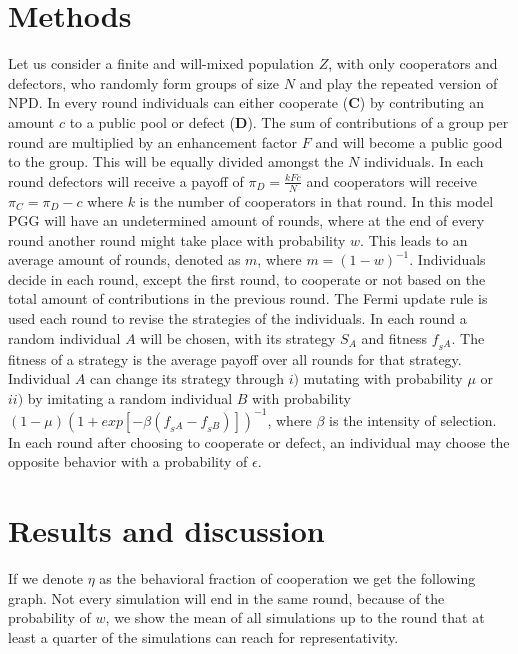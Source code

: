 \documentclass[letterpaper]{article}
\begin{document}
\section{Methods}
Let us consider a finite and will-mixed population $Z$, with only cooperators and defectors, who randomly form groups of size $N$ and play the repeated version of NPD. In every round individuals can either cooperate (\textbf{C}) by contributing an amount $c$ to a public pool or defect (\textbf{D}). The sum of contributions of a group per round are multiplied by an enhancement factor $F$ and will become a public good to the group. This will be equally divided amongst  the $N$ individuals. In each round defectors will receive a payoff of $\pi_{D}= \frac{kFc}{N}$  and cooperators will receive $\pi_{C}=\pi_{D}-c$ where $k$ is the number of cooperators in that round. In this model PGG will have an undetermined amount of rounds, where at the end of every round another round might take place with probability $w$. This leads to an average amount of rounds, denoted as $m$, where $m= (1-w)^{-1}$. Individuals decide in each round, except the first round, to cooperate or not based on the total amount of contributions in the previous round.
The Fermi update rule \citep{traulsen2006stochastic,grujic2014comparative} is used each round to revise the strategies of the individuals.
In each round a random individual $A$ will be chosen, with its strategy $S_{A}$ and fitness $f_{_S{A}}$. The fitness of a strategy is the average payoff over all rounds for that strategy. Individual $A$ can change its strategy through $i)$ mutating with probability $\mu$ or $ii)$ by imitating a random individual $B$ with probability $(1-\mu)(1+exp[-\beta(f_{_S{A}}-f_{_S{B}})])^{-1}$, where $\beta$ is the intensity of selection.
In each round after choosing to cooperate or defect, an individual may choose the opposite behavior with a probability of $\epsilon$.


\section{Results and discussion}
If we denote $\eta$ as the behavioral fraction of cooperation we get the following graph. Not every simulation will end in the same round, because of the probability of $w$, we show the mean of all simulations up to the round that at least a quarter of the simulations can reach for representativity.
\end{document}
